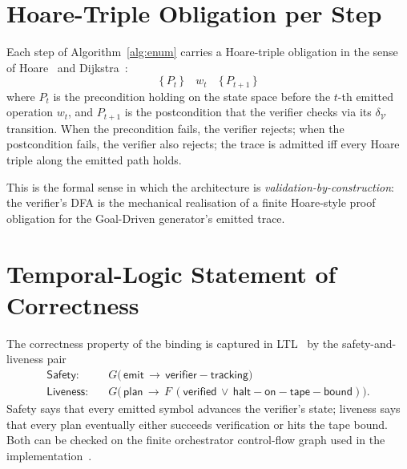
\section{Hoare-Triple Obligation per Step}
\label{sec:hoare-archived}

Each step of Algorithm~\ref{alg:enum} carries a Hoare-triple
obligation in the sense of
Hoare~\cite{hoare1969axiomatic} and
Dijkstra~\cite{dijkstra1975guarded}:
\[
\{\,P_t\,\}\quad w_t\quad\{\,P_{t+1}\,\}
\]
where $P_t$ is the precondition holding on the state space
before the $t$-th emitted operation $w_t$, and $P_{t+1}$ is the
postcondition that the verifier checks via its
$\delta_\mathcal{V}$ transition.  When the precondition fails,
the verifier rejects; when the postcondition fails, the verifier
also rejects; the trace is admitted iff every Hoare triple
along the emitted path holds.

This is the formal sense in which the architecture is
\emph{validation-by-construction}: the verifier's DFA is the
mechanical realisation of a finite Hoare-style proof obligation
for the Goal-Driven generator's emitted trace.

\section{Temporal-Logic Statement of Correctness}

The correctness property of the binding is captured in
LTL~\cite{pnueli1977temporal} by the safety-and-liveness pair
\begin{align*}
\textsf{Safety:}\quad &
G\bigl(\,\mathsf{emit}\,\to\,\mathsf{verifier-tracking}\bigr) \\
\textsf{Liveness:}\quad &
G\bigl(\,\mathsf{plan}\,\to\,F\,(\mathsf{verified}\,\vee\,
\mathsf{halt-on-tape-bound})\bigr).
\end{align*}
Safety says that every emitted symbol advances the verifier's
state; liveness says that every plan eventually either succeeds
verification or hits the tape bound.  Both can be checked on the finite orchestrator control-flow graph
used in the implementation~\cite{clarke1981ctl,clarke1999modelchecking}.

